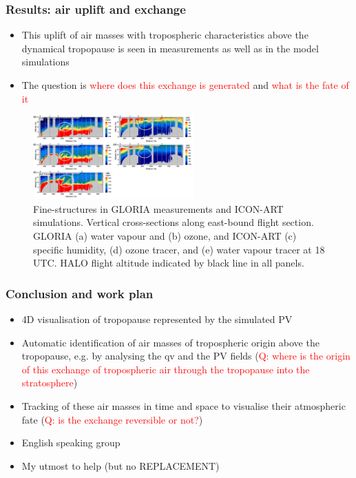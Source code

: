 \documentclass[18pt]{beamer}
\begin{document}
	\begin{frame}
	
		\frametitle{Results: air uplift and exchange}
		\large
		
		\begin{itemize}
			\item \small{This uplift of air masses with tropospheric characteristics above the dynamical tropopause is seen in measurements as well as in the model simulations}
			\item \small{ The question is \textcolor{red}{where does this exchange is generated} and \textcolor{red}{what is the fate of it}}
		\end{itemize}
		
		\begin{figure}
			\includegraphics[width=0.55\textwidth]{../figs/uplift.png}
			\caption{\footnotesize {Fine-structures in GLORIA measurements and ICON-ART simulations. Vertical cross-sections along east-bound flight section. GLORIA (a) water vapour and (b) ozone, and ICON-ART (c) specific humidity, (d) ozone tracer, and (e) water vapour tracer at 18 UTC. HALO flight altitude indicated by black line in all panels. }
			}
		\end{figure}
		
	\end{frame}

	
	\begin{frame}
		\frametitle{Conclusion and work plan}
		\large

		\begin{itemize}
			\item 4D visualisation of tropopause represented by the simulated PV
			\item Automatic identification of air masses of tropospheric origin above the tropopause, e.g. by analysing the qv and the PV fields (\textcolor{red}{Q: where is the origin of this exchange of tropospheric air through the tropopause into the stratosphere})
			\item Tracking of these air masses in time and space to visualise their atmospheric fate (\textcolor{red}{Q: is the exchange reversible or not?})
			\item English speaking group
			\item My utmost to help (but no REPLACEMENT)
		\end{itemize}

	\end{frame}

	
\end{document}

